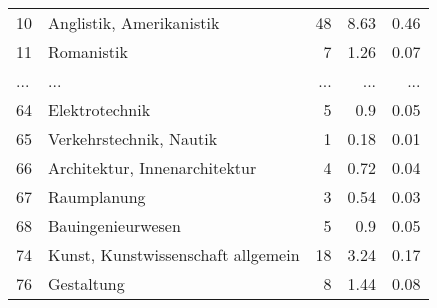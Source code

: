 \begin{longtable}{lXrrr}
        10 & \multicolumn{1}{X}{Anglistik, Amerikanistik} & %
          \num{48} &
          \num[round-mode=places,round-precision=2]{8,63} &
          \num[round-mode=places,round-precision=2]{0,46} \\
        11 & \multicolumn{1}{X}{Romanistik} & %
          \num{7} &
          \num[round-mode=places,round-precision=2]{1,26} &
          \num[round-mode=places,round-precision=2]{0,07} \\
       ... & ... & ... & ... & ... \\
        64 & \multicolumn{1}{X}{Elektrotechnik} & %
          \num{5} &
          \num[round-mode=places,round-precision=2]{0,9} &
          \num[round-mode=places,round-precision=2]{0,05} \\

        65 & \multicolumn{1}{X}{Verkehrstechnik, Nautik} & %
          \num{1} &
          \num[round-mode=places,round-precision=2]{0,18} &
          \num[round-mode=places,round-precision=2]{0,01} \\

        66 & \multicolumn{1}{X}{Architektur, Innenarchitektur} & %
          \num{4} &
          \num[round-mode=places,round-precision=2]{0,72} &
          \num[round-mode=places,round-precision=2]{0,04} \\

        67 & \multicolumn{1}{X}{Raumplanung} & %
          \num{3} &
          \num[round-mode=places,round-precision=2]{0,54} &
          \num[round-mode=places,round-precision=2]{0,03} \\

        68 & \multicolumn{1}{X}{Bauingenieurwesen} & %
          \num{5} &
          \num[round-mode=places,round-precision=2]{0,9} &
          \num[round-mode=places,round-precision=2]{0,05} \\

        74 & \multicolumn{1}{X}{Kunst, Kunstwissenschaft allgemein} & %
          \num{18} &
          \num[round-mode=places,round-precision=2]{3,24} &
          \num[round-mode=places,round-precision=2]{0,17} \\

        76 & \multicolumn{1}{X}{Gestaltung} & %
          \num{8} &
          \num[round-mode=places,round-precision=2]{1,44} &
          \num[round-mode=places,round-precision=2]{0,08} \\


\end{longtable}

